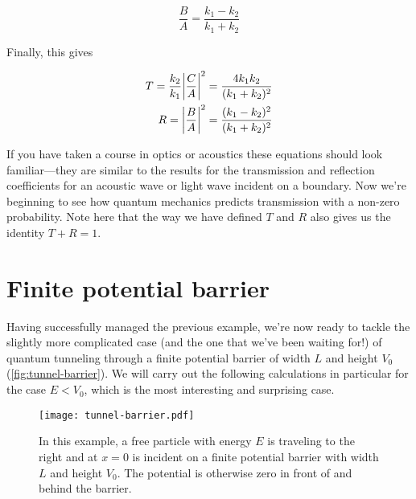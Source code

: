 \begin{equation}
	\frac{B}{A} = \frac{k_1 - k_2}{k_1 + k_2} \label{eq:b-a}
\end{equation}

Finally, this gives 

\begin{tcolorbox}[title = $T$ and $R$ for finite potential step] \vspace{-2ex}
	\begin{align}
		T = \frac{k_2}{k_1}\abs{\frac{C}{A}}^2 &= \frac{4k_1k_2}{(k_1+k_2)^2} \label{eq:t-step} \\ 
		R = \abs{\frac{B}{A}}^2 &= \frac{(k_1-k_2)^2}{(k_1+k_2)^2} \label{eq:r-step}
	\end{align}
\end{tcolorbox}

If you have taken a course in optics or acoustics these equations should look familiar---they are similar to the results for the transmission and reflection coefficients for an acoustic wave or light wave incident on a boundary. 
Now we're beginning to see how quantum mechanics predicts transmission with a non-zero probability. 
Note here that the way we have defined $T$ and $R$ also gives us the identity $T + R = 1$.


\section{Finite potential barrier} \label{sec:tunnel-barrier}

Having successfully managed the previous example, we're now ready to tackle the slightly more complicated case (and the one that we've been waiting for!) of quantum tunneling through a finite potential barrier of width $L$ and height $V_0$ (\autoref{fig:tunnel-barrier}). 
We will carry out the following calculations in particular for the case $E < V_0$, which is the most interesting and surprising case.

\begin{figure}[!h]
	\centering
	\texttt{[image: tunnel-barrier.pdf]}
	\caption{In this example, a free particle with energy $E$ is traveling to the right and at $x = 0$ is incident on a finite potential barrier with width $L$ and height $V_0$. 
	The potential is otherwise zero in front of and behind the barrier.}
	\label{fig:tunnel-barrier}
\end{figure}

